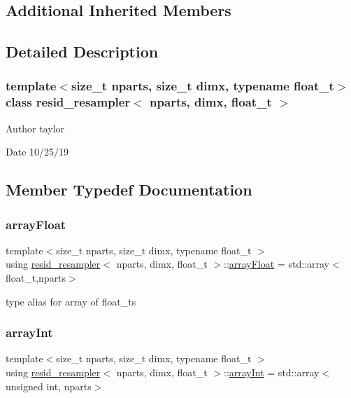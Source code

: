 \subsection*{Additional Inherited Members}


\subsection{Detailed Description}
\subsubsection*{template$<$size\+\_\+t nparts, size\+\_\+t dimx, typename float\+\_\+t$>$\newline
class resid\+\_\+resampler$<$ nparts, dimx, float\+\_\+t $>$}

\begin{DoxyAuthor}{Author}
taylor 
\end{DoxyAuthor}
\begin{DoxyDate}{Date}
10/25/19 
\end{DoxyDate}


\subsection{Member Typedef Documentation}
\mbox{\label{classresid__resampler_ab95ecc6d5a33f1cbc9089a6b818df405}} 
\subsubsection{\texorpdfstring{array\+Float}{arrayFloat}}
{\footnotesize\ttfamily template$<$size\+\_\+t nparts, size\+\_\+t dimx, typename float\+\_\+t $>$ \\
using \hyperlink{classresid__resampler}{resid\+\_\+resampler}$<$ nparts, dimx, float\+\_\+t $>$\+::\hyperlink{classrbase_a6f76bef853e508cb5b6f546d231b06f5}{array\+Float} =  std\+::array$<$float\+\_\+t,nparts$>$}

type alias for array of float\+\_\+ts \mbox{\label{classresid__resampler_a2ca1138b2d0fcad22c3720c83e56fc47}} 
\subsubsection{\texorpdfstring{array\+Int}{arrayInt}}
{\footnotesize\ttfamily template$<$size\+\_\+t nparts, size\+\_\+t dimx, typename float\+\_\+t $>$ \\
using \hyperlink{classresid__resampler}{resid\+\_\+resampler}$<$ nparts, dimx, float\+\_\+t $>$\+::\hyperlink{classresid__resampler_a2ca1138b2d0fcad22c3720c83e56fc47}{array\+Int} =  std\+::array$<$unsigned int, nparts$>$}

